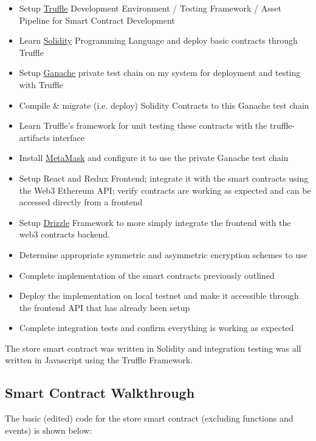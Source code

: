 \documentclass[12pt,oneside]{amsart}
\begin{document}
\begin{multicols}{2}
\begin{itemize}
  \item Setup \href{http://truffleframework.com/docs/}{Truffle} Development Environment / Testing Framework / Asset Pipeline for Smart Contract Development
  \item Learn \href{https://solidity.readthedocs.io/en/v0.4.21/}{Solidity} Programming Language and deploy basic contracts through Truffle
  \item Setup \href{http://truffleframework.com/docs/ganache/using}{Ganache} private test chain on my system for deployment and testing with Truffle
  \item Compile \& migrate (i.e. deploy) Solidity Contracts to this Ganache test chain
  \item Learn Truffle's framework for unit testing these contracts with the truffle-artifacts interface
  \item Install \href{https://metamask.io/}{MetaMask} and configure it to use the private Ganache test chain
  \item Setup React and Redux Frontend; integrate it with the smart contracts using the Web3 Ethereum API;
    verify contracts are working as expected and can be accessed directly from a frontend
  \item Setup \href{http://truffleframework.com/docs/drizzle/getting-started}{Drizzle} Framework to more simply integrate the frontend with the web3 contracts backend.
  \item Determine appropriate symmetric and asymmetric encryption schemes to use
  \item Complete implementation of the smart contracts previously outlined
  \item Deploy the implementation on local testnet and make it accessible through the frontend API that has already been setup
  \item Complete integration tests and confirm everything is working as expected
\end{itemize}

The store smart contract was written in Solidity and integration testing was all written in Javascript using the Truffle Framework.

\end{multicols}
\subsection{Smart Contract Walkthrough}

The basic (edited) code for the store smart contract (excluding functions and events) is shown below:
\end{document}
